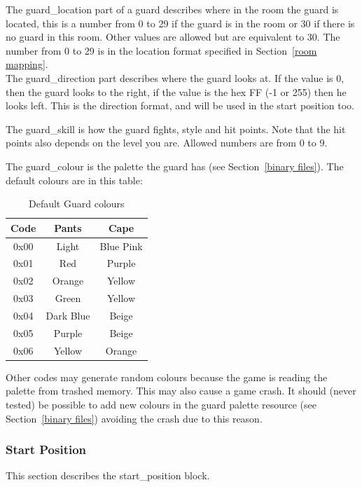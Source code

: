 \documentclass{article}
\begin{document}
 The guard\_location part of a guard describes where in the room the guard
 is located, this is a number from 0 to 29 if the guard is in the room or
 30 if there is no guard in this room. Other values are allowed but are
 equivalent to 30. The number from 0 to 29 is in the location format
 specified in Section~\ref{room mapping}.\\

 The guard\_direction part describes where the guard looks at. If the value
 is 0, then the guard looks to the right, if the value is the hex FF (-1 or
 255) then he looks left. This is the direction format, and will be used in
 the start position too.

 The guard\_skill is how the guard fights, style and hit points. Note that
 the hit points also depends on the level you are. Allowed numbers are from
 0 to 9.


 The guard\_colour is the palette the guard has (see Section~\ref{binary files}).
 The default colours are in this table:

\begin{table}
\begin{tabular}{ccc}
\hline
Code & Pants    & Cape \\
\hline
0x00 & Light    & Blue Pink \\
0x01 & Red      & Purple \\
0x02 & Orange   & Yellow \\
0x03 & Green    & Yellow \\
0x04 & Dark Blue& Beige \\
0x05 & Purple   & Beige \\
0x06 & Yellow   & Orange \\
\hline
\end{tabular}
\caption{Default Guard colours}
\label{palettes table}
\end{table}

 Other codes may generate random colours because the game is reading
 the palette from trashed memory. This may also cause a game crash.
 It should (never tested) be possible to add new colours in the guard
 palette resource (see Section~\ref{binary files}) avoiding the crash due to this reason.


\subsubsection{Start Position \label{start position}} %
 This section describes the start\_position block.
\end{document}
